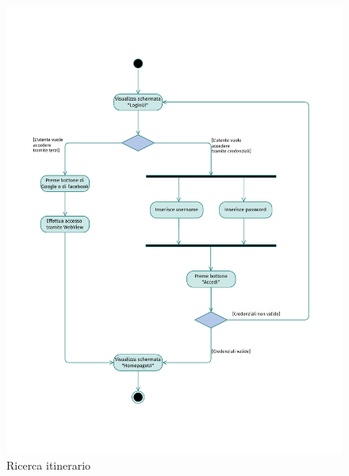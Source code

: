 \documentclass{natourDoc}
\begin{document}
\newpage
\begin{figure}[!htbp]
	\centering
	\includegraphics[width=\textwidth, page=2]{./diagrams/activity.pdf}
	\caption{Ricerca itinerario}
\end{figure}
\FloatBarrier
\end{document}
